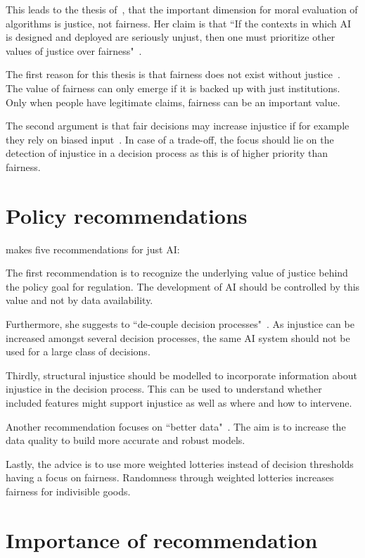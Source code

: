 This leads to the thesis of~\cite{vredenburgh}, that the important dimension for moral evaluation of algorithms is justice, not fairness.
Her claim is that ``If the contexts in which AI is designed and deployed are seriously unjust, then one must prioritize other values of justice over fairness"~\parencite[][19]{vredenburgh}.

The first reason for this thesis is that fairness does not exist without justice~\parencite[][19]{vredenburgh}.
The value of fairness can only emerge if it is backed up with just institutions.
Only when people have legitimate claims, fairness can be an important value.

The second argument is that fair decisions may increase injustice if for example they rely on biased input~\parencite[][19]{vredenburgh}.
In case of a trade-off, the focus should lie on the detection of injustice in a decision process as this is of higher priority than fairness.

\section*{Policy recommendations}

\cite{vredenburgh} makes five recommendations for just AI:

The first recommendation is to recognize the underlying value of justice behind the policy goal for regulation.
The development of AI should be controlled by this value and not by data availability.

Furthermore, she suggests to ``de-couple decision processes"~\parencite[][22]{vredenburgh}.
As injustice can be increased amongst several decision processes, the same AI system should not be used for a large class of decisions.

Thirdly, structural injustice should be modelled to incorporate information about injustice in the decision process.
This can be used to understand whether included features might support injustice as well as where and how to intervene.

Another recommendation focuses on ``better data"~\parencite[][24]{vredenburgh}.
The aim is to increase the data quality to build more accurate and robust models.

Lastly, the advice is to use more weighted lotteries instead of decision thresholds having a focus on fairness.
Randomness through weighted lotteries increases fairness for indivisible goods.

\section*{Importance of recommendation}

